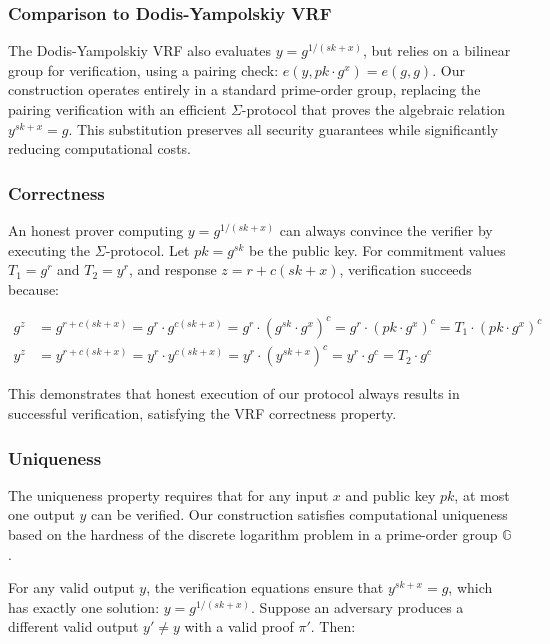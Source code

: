 \subsubsection{Comparison to Dodis-Yampolskiy VRF}
The Dodis-Yampolskiy VRF also evaluates $y = g^{1/(sk + x)}$, but relies on a bilinear group for verification, using a pairing check: $e(y, pk \cdot g^x) = e(g, g)$. Our construction operates entirely in a standard prime-order group, replacing the pairing verification with an efficient $\Sigma$-protocol that proves the algebraic relation $y^{sk+x} = g$. This substitution preserves all security guarantees while significantly reducing computational costs.

\subsubsection{Correctness}
An honest prover computing $y = g^{1/(sk+x)}$ can always convince the verifier by executing the $\Sigma$-protocol. Let $pk = g^{sk}$ be the public key. For commitment values $T_1 = g^r$ and $T_2 = y^r$, and response $z = r + c(sk+x)$, verification succeeds because:

\begin{align}
g^z &= g^{r + c(sk+x)} = g^r \cdot g^{c(sk+x)} = g^r \cdot (g^{sk} \cdot g^x)^c = g^r \cdot (pk \cdot g^x)^c = T_1 \cdot (pk \cdot g^x)^c \\
y^z &= y^{r + c(sk+x)} = y^r \cdot y^{c(sk+x)} = y^r \cdot (y^{sk+x})^c = y^r \cdot g^c = T_2 \cdot g^c
\end{align}

This demonstrates that honest execution of our protocol always results in successful verification, satisfying the VRF correctness property.



\subsubsection{Uniqueness}
The uniqueness property requires that for any input $x$ and public key $pk$, at most one output $y$ can be verified. Our construction satisfies computational uniqueness based on the hardness of the discrete logarithm problem in a prime-order group $\mathbb{G}$.

For any valid output $y$, the verification equations ensure that $y^{sk+x} = g$, which has exactly one solution: $y = g^{1/(sk+x)}$. Suppose an adversary produces a different valid output $y' \neq y$ with a valid proof $\pi'$. Then:

